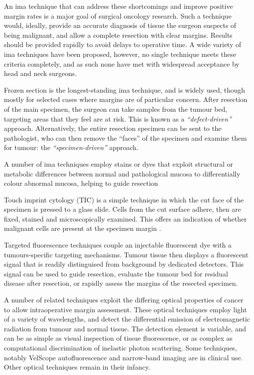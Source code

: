 An \gls{ima} technique that can address these shortcomings and improve positive margin rates is a major goal of surgical oncology research.
Such a technique would, ideally, provide an accurate diagnosis of tissue the surgeon suspects of being malignant, and allow a complete resection with clear margins.
Results should be provided rapidly to avoid delays to operative time.
A wide variety of \gls{ima} techniques have been proposed, however, no single technique meets these criteria completely, and as such none have met with widespread acceptance by head and neck surgeons.

Frozen section is the longest-standing \gls{ima} technique, and is widely used, though mostly for selected cases where margins are of particular concern.
After resection of the main specimen, the surgeon can take samples from the tumour bed, targeting  areas that they feel are at risk.
This is known as a \emph{``defect-driven''} approach.
Alternatively, the entire resection specimen can be sent to the pathologist, who can then remove the ``faces'' of the specimen and examine them for tumour: the \emph{``specimen-driven''} approach.

A number of \gls{ima} techniques employ stains or dyes that exploit structural or metabolic differences between normal and pathological mucosa to differentially colour abnormal mucosa, helping to guide resection\cite{mccaulj.a.LIHNCSLugolIodine2013, allegraEarlyGlotticCancer2020}

Touch imprint cytology (TIC) is a simple technique in which the cut face of the specimen is pressed to a glass slide. 
Cells from the cut surface adhere, then are fixed, stained and microscopically examined. 
This offers an indication of whether malignant cells are present at the specimen margin \cite{naveedDiagnosticAccuracyTouch2017}.

Targeted fluorescence techniques couple an injectable fluorescent dye with a tumours-specific targeting mechanisms.
Tumour tissue then displays a fluorescent signal that is readily distinguised from background by dedicated detectors.
This signal can be used to guide resection, evaluate the tumour bed for residual disease after resection, or rapidly assess the margins of the resected specimen.

A number of related techniques exploit the differing optical properties of cancer to allow intraoperative margin assessment.
These optical techniques employ light of a variety of wavelengths, and detect the differential emission of electromagnetic radiation from tumour and normal tissue. 
The detection element is variable, and can be as simple as visual inspection of tissue fluorescence, or as complex as computational discrimination of inelastic photon scattering.
Some techniques, notably VelScope autofluorescence and narrow-band imaging are in clinical use.
Other optical techniques remain in their infancy.

